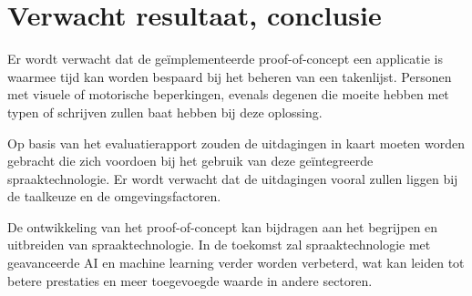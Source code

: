 

\section{Verwacht resultaat, conclusie}%
\label{sec:verwachte_resultaten}




Er wordt verwacht dat de geïmplementeerde proof-of-concept een applicatie is waarmee tijd kan worden bespaard bij het beheren van een takenlijst. Personen met visuele of motorische beperkingen, evenals degenen die moeite hebben met typen of schrijven zullen baat hebben bij deze oplossing. 

Op basis van het evaluatierapport zouden de uitdagingen in kaart moeten worden gebracht die zich voordoen bij het gebruik van deze geïntegreerde spraaktechnologie. Er wordt verwacht dat de uitdagingen vooral zullen liggen bij de taalkeuze en de omgevingsfactoren.

De ontwikkeling van het proof-of-concept kan bijdragen aan het begrijpen en uitbreiden van spraaktechnologie. In de toekomst zal spraaktechnologie met geavanceerde AI en machine learning verder worden verbeterd, wat kan leiden tot betere prestaties en meer toegevoegde waarde in andere sectoren.
